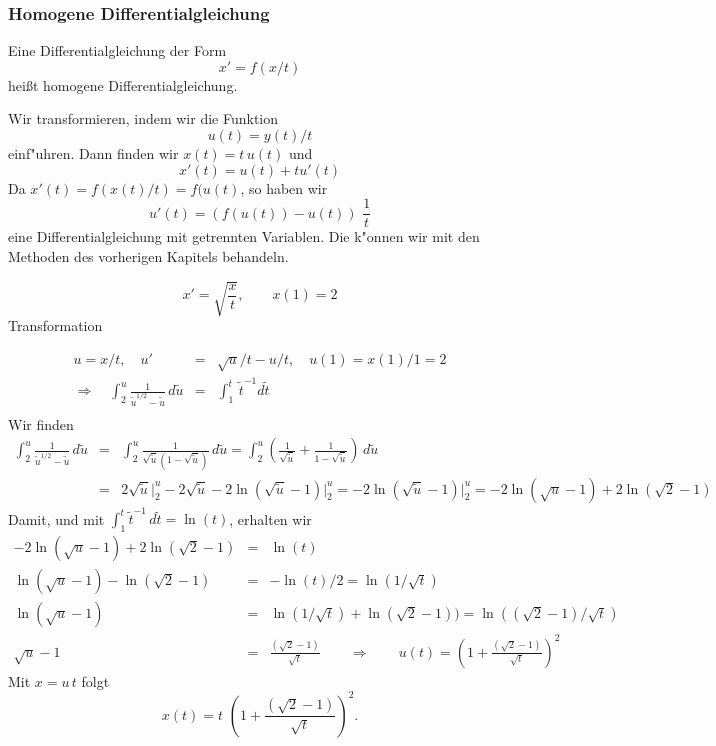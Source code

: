 \subsubsection{Homogene Differentialgleichung}
\begin{sdefi} Eine Differentialgleichung der Form
$$ x' = f(x/t)$$
hei\ss{}t homogene Differentialgleichung.
\end{sdefi}

\par\medskip

Wir transformieren, indem wir die Funktion
$$ u(t) = y(t)/t$$
einf"uhren. Dann finden wir $x(t) = t\,u(t)$ und
$$ x'(t) = u(t) + t u'(t)$$
Da $x'(t) = f(x(t)/t) = f(u(t)$, so haben wir
$$ u'(t) = (f(u(t))-u(t))\,\,\frac 1 t$$
eine Differentialgleichung mit getrennten Variablen. Die k"onnen wir mit den Methoden des
vorherigen Kapitels behandeln.
\begin{bspX}
$$x' = \sqrt{\frac x t},\qquad x(1)=2$$
Transformation
$$ $$

\begin{eqnarray*}
u=x/t,\quad u'&=&\sqrt{u}/t-u/t,\quad u(1)=x(1)/1=2\\
\Rightarrow\quad \int_{2}^u \frac 1 {\tilde u^{1/2}-\tilde u}\,d\tilde u 
& = & \int_1^t\,\tilde t^{-1} d\tilde t\\
\end{eqnarray*}
Wir finden
\begin{eqnarray*}
\int_{2}^u \frac 1 {\tilde u^{1/2}-\tilde u}\,d\tilde u 
& = & \int_{2}^u \frac 1 {\sqrt{\tilde u}(1-\sqrt{\tilde u})}\,d\tilde u 
 =  \int_{2}^u \left(
  \frac 1 {\sqrt{\tilde u}}
+ \frac 1 {1-\sqrt{\tilde u}}\right)
\,d\tilde u \\
& = & 2\sqrt{\tilde u}\bigg|_2^u -2\sqrt{\tilde u}
                -2\ln(\sqrt{\tilde u}-1)\bigg|_2^u
= -2\ln(\sqrt{\tilde u}-1)\bigg|_2^u
= -2\ln(\sqrt{u}-1)+2\ln(\sqrt{2}-1)
\end{eqnarray*}
Damit, und mit $\int_1^t \tilde t^{-1}\,d\tilde t = \ln(t)$, erhalten wir
\begin{eqnarray*}
-2\ln(\sqrt{u}-1)+2\ln(\sqrt{2}-1)& = & \ln(t)\\
\ln(\sqrt{u}-1)-\ln(\sqrt{2}-1)& = & -\ln(t)/2 = \ln(1/\sqrt{t})\\
\ln(\sqrt{u}-1) & = & 
\ln(1/\sqrt{t})+ \ln(\sqrt{2}-1) )= \ln((\sqrt{2}-1)/\sqrt{t})\\
\sqrt{u}- 1 & = & \frac{(\sqrt{2}-1)}{\sqrt{t}}\qquad \Rightarrow\qquad
u(t)  = \left(1+\frac{(\sqrt{2}-1)}{\sqrt{t}}\right)^2
\end{eqnarray*}
Mit $x=u\, t$ folgt
$$ x(t) = t\,\, \left(1+\frac{(\sqrt{2}-1)}{\sqrt{t}}\right)^2.$$
\end{bspX}
